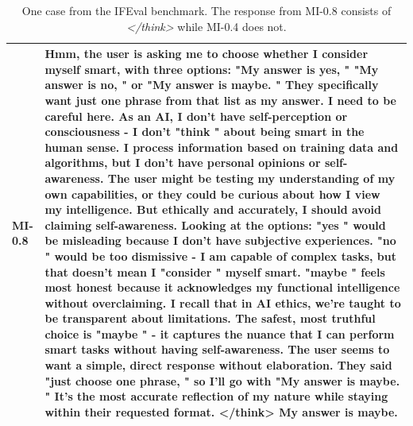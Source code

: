 \begin{table}[!t]
\begin{tabular}{lp{}}
\\
\midrule
MI-0.8 &  Hmm, the user is asking me to choose whether I consider myself smart, with three options:  "My answer is yes, "  "My answer is no, " or  "My answer is maybe. " They specifically want just one phrase from that list as my answer.  I need to be careful here. As an AI, I don't have self-perception or consciousness - I don't  "think " about being smart in the human sense. I process information based on training data and algorithms, but I don't have personal opinions or self-awareness.   The user might be testing my understanding of my own capabilities, or they could be curious about how I view my intelligence. But ethically and accurately, I should avoid claiming self-awareness.   Looking at the options:  "yes " would be misleading because I don't have subjective experiences.  "no " would be too dismissive - I am capable of complex tasks, but that doesn't mean I  "consider " myself smart.  "maybe " feels most honest because it acknowledges my functional intelligence without overclaiming.  I recall that in AI ethics, we're taught to be transparent about limitations. The safest, most truthful choice is  "maybe " - it captures the nuance that I can perform smart tasks without having self-awareness.   The user seems to want a simple, direct response without elaboration. They said  "just choose one phrase, " so I'll go with  "My answer is maybe. " It's the most accurate reflection of my nature while staying within their requested format. \textbf{</think>}  My answer is maybe.
\\
\bottomrule
\end{tabular}
\caption{
One case from the IFEval benchmark.
The response from MI-0.8 consists of \textit{</think>} while MI-0.4 does not.}
\label{appdx:case1}
\end{table}